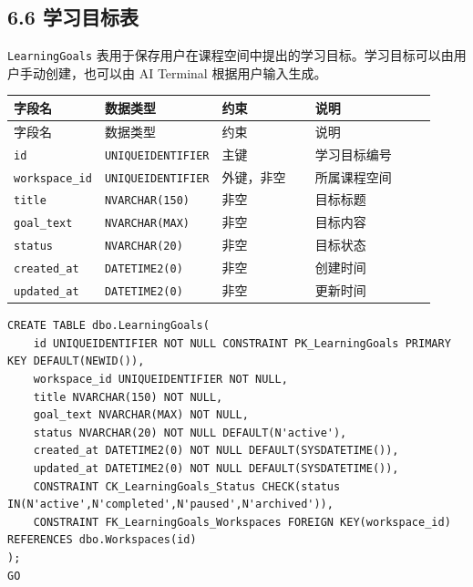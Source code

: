\documentclass[10pt,a4paper,fontset=none]{ctexart}
\begin{document}
\subsection*{6.6 学习目标表}

\texttt{LearningGoals} 表用于保存用户在课程空间中提出的学习目标。学习目标可以由用户手动创建，也可以由 AI Terminal 根据用户输入生成。\par

\begingroup\scriptsize
\renewcommand{\arraystretch}{1.18}
\setlength{\LTleft}{0pt}
\setlength{\LTright}{0pt}
\begin{longtable}{>{\raggedright\arraybackslash}p{0.20\linewidth}>{\raggedright\arraybackslash}p{0.16\linewidth}>{\raggedright\arraybackslash}p{0.24\linewidth}>{\raggedright\arraybackslash}p{0.32\linewidth}}
\toprule
字段名 & 数据类型 & 约束 & 说明 \\
\midrule
\endfirsthead
\toprule
字段名 & 数据类型 & 约束 & 说明 \\
\midrule
\endhead
\texttt{id} & \texttt{UNIQUEIDENTIFIER} & 主键 & 学习目标编号 \\
\texttt{workspace\_id} & \texttt{UNIQUEIDENTIFIER} & 外键，非空 & 所属课程空间 \\
\texttt{title} & \texttt{NVARCHAR(150)} & 非空 & 目标标题 \\
\texttt{goal\_text} & \texttt{NVARCHAR(MAX)} & 非空 & 目标内容 \\
\texttt{status} & \texttt{NVARCHAR(20)} & 非空 & 目标状态 \\
\texttt{created\_at} & \texttt{DATETIME2(0)} & 非空 & 创建时间 \\
\texttt{updated\_at} & \texttt{DATETIME2(0)} & 非空 & 更新时间 \\
\bottomrule
\end{longtable}
\endgroup


\begin{Verbatim}[fontsize=\scriptsize,frame=single]
CREATE TABLE dbo.LearningGoals(
    id UNIQUEIDENTIFIER NOT NULL CONSTRAINT PK_LearningGoals PRIMARY KEY DEFAULT(NEWID()),
    workspace_id UNIQUEIDENTIFIER NOT NULL,
    title NVARCHAR(150) NOT NULL,
    goal_text NVARCHAR(MAX) NOT NULL,
    status NVARCHAR(20) NOT NULL DEFAULT(N'active'),
    created_at DATETIME2(0) NOT NULL DEFAULT(SYSDATETIME()),
    updated_at DATETIME2(0) NOT NULL DEFAULT(SYSDATETIME()),
    CONSTRAINT CK_LearningGoals_Status CHECK(status IN(N'active',N'completed',N'paused',N'archived')),
    CONSTRAINT FK_LearningGoals_Workspaces FOREIGN KEY(workspace_id) REFERENCES dbo.Workspaces(id)
);
GO
\end{Verbatim}
\end{document}
